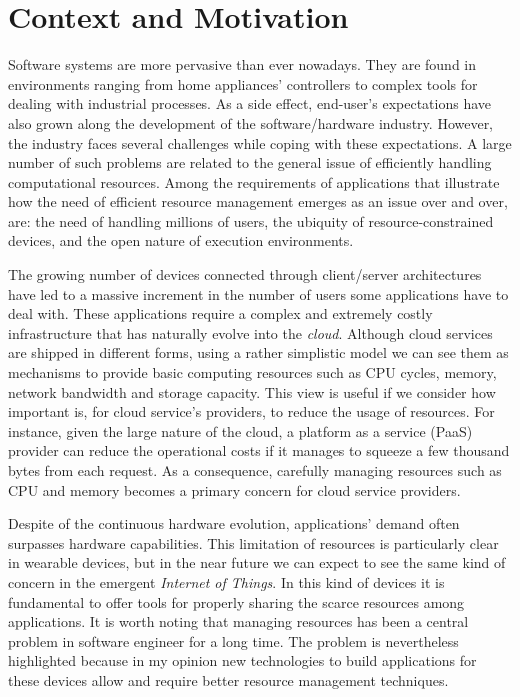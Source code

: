 \section{Context and Motivation}

Software systems are more pervasive than ever nowadays.
They are found in environments ranging from home appliances' controllers to complex tools for dealing with industrial processes.
As a side effect, end-user's expectations have also grown along the development of the software/hardware industry.
However, the industry faces several challenges while coping with these expectations.
A large number of such problems are related to the general issue of efficiently handling computational resources.
Among the requirements of applications that illustrate how the need of efficient resource management emerges as an issue over and over, are: the need of handling millions of users, the ubiquity of resource-constrained devices, and the open nature of execution environments.

The growing number of devices connected through client/server architectures have led to a massive increment in the number of users some applications have to deal with.
These applications require a complex and extremely costly infrastructure that has naturally evolve into the \textit{cloud}.
Although cloud services are shipped in different forms, using a rather simplistic model we can see them as mechanisms to provide basic computing resources such as CPU cycles, memory, network bandwidth and storage capacity.
This view is useful if we consider how important is, for cloud service's providers, to reduce the usage of resources.
For instance, given the large nature of the cloud, a platform as a service (PaaS) provider can reduce the operational costs if it manages to squeeze a few thousand bytes from each request.
As a consequence, carefully managing resources such as CPU and memory becomes a primary concern for cloud service providers.

Despite of the continuous hardware evolution, applications' demand often surpasses hardware capabilities.
This limitation of resources is particularly clear in wearable devices, but in the near future we can expect to see the same kind of concern in the emergent \textit{Internet of Things}.
In this kind of devices it is fundamental to offer tools for properly sharing the scarce resources among applications.
It is worth noting that managing resources has been a central problem in software engineer for a long time.
The problem is nevertheless highlighted because in my opinion new technologies to build applications for these devices allow and require better resource management techniques.

